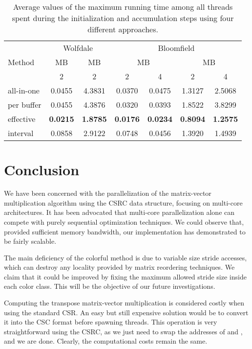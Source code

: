 \documentclass[11pt]{article}
\begin{document}
\begin{table}[t]
\caption{Average values of the maximum running time among all threads spent during the initialization and accumulation steps using four different approaches.}
\label{tab:matvec_bench-acctime}
\centering
\renewcommand{\arraystretch}{1.1}
{\footnotesize
\begin{tabular}{@{}l@{\ \ }c@{\ \ }cc@{\ \ }cc@{\ \ }c@{}}
\toprule
\multirow{3}{*}{Method} & \multicolumn{2}{c}{Wolfdale} & \multicolumn{4}{c}{Bloomfield}\\\cmidrule(r){2-3}\cmidrule(l){4-7}
 & MB & MB & \multicolumn{2}{c}{MB} & \multicolumn{2}{c}{MB}\\\cmidrule(r){2-2}\cmidrule(r){3-3}\cmidrule(lr){4-5}\cmidrule(l){6-7}
 & 2 & 2 & 2 & 4 & 2 & 4\\
\midrule
all-in-one & 0.0455 & 4.3831 & 0.0370 & 0.0475 & 1.3127 & 2.5068\\
per buffer & 0.0455 & 4.3876 & 0.0320 & 0.0393 & 1.8522 & 3.8299\\
effective  & \textbf{0.0215} & \textbf{1.8785} & \textbf{0.0176} & \textbf{0.0234} & \textbf{0.8094} & \textbf{1.2575}\\
interval  & 0.0858 & 2.9122 & 0.0748 & 0.0456 & 1.3920 & 1.4939\\
\bottomrule
\end{tabular}}
\end{table}

\section{Conclusion}
\label{sec:conclusion}

We have been concerned with the parallelization of the matrix-vector multiplication
algorithm using the CSRC data structure, focusing on multi-core
architectures.  It has been advocated that multi-core parallelization alone can
compete with purely sequential optimization techniques.  We could observe that,
provided sufficient memory bandwidth, our implementation has demonstrated to be fairly scalable.

The main deficiency of the colorful method is due to variable size stride
accesses, which can destroy any locality provided by matrix reordering
techniques.  We claim that it could be improved by fixing the maximum allowed
stride size inside each color class.  This will be the objective of our future
investigations.

Computing the transpose matrix-vector multiplication is
considered costly when using the standard CSR. An easy but still expensive solution
would be to convert it into the CSC format before spawning threads.
This operation is very straightforward using the CSRC,
as we just need to swap the addresses of  and , and we are done.
Clearly, the computational costs remain the same.
\end{document}
